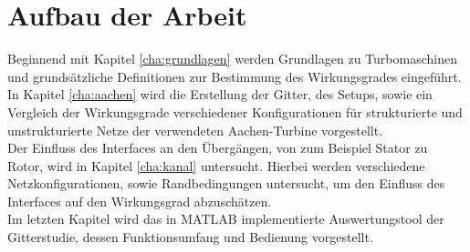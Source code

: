 \section*{Aufbau der Arbeit}
Beginnend mit Kapitel \ref{cha:grundlagen} werden Grundlagen zu Turbomaschinen und grundsätzliche Definitionen zur Bestimmung des Wirkungsgrades eingeführt.\\
In Kapitel \ref{cha:aachen} wird die Erstellung der Gitter, des Setups, sowie ein Vergleich der Wirkungsgrade verschiedener Konfigurationen für strukturierte und unstrukturierte Netze der verwendeten Aachen-Turbine vorgestellt.\\
Der Einfluss des Interfaces an den Übergängen, von zum Beispiel Stator zu Rotor, wird in Kapitel \ref{cha:kanal} untersucht. Hierbei werden verschiedene Netzkonfigurationen, sowie Randbedingungen untersucht, um den Einfluss des Interfaces auf den Wirkungsgrad abzuschätzen.\\
Im letzten Kapitel wird das in MATLAB implementierte Auswertungstool der Gitterstudie, dessen Funktionsumfang und Bedienung vorgestellt. 